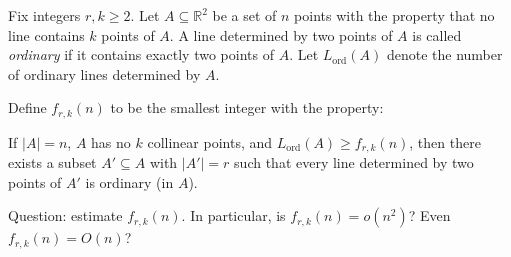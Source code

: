 Fix integers $r,k\ge 2$.
Let $A\subseteq\mathbb{R}^2$ be a set of $n$ points with the property that no line contains $k$ points of $A$.
A line determined by two points of $A$ is called \emph{ordinary} if it contains exactly two points of $A$.
Let $L_\mathrm{ord}(A)$ denote the number of ordinary lines determined by $A$.

Define $f_{r,k}(n)$ to be the smallest integer with the property:

If $|A|=n$, $A$ has no $k$ collinear points, and $L_\mathrm{ord}(A)\ge f_{r,k}(n)$, then there exists a subset $A'\subseteq A$ with $|A'|=r$ such that every line determined by two points of $A'$ is ordinary (in $A$).

Question: estimate $f_{r,k}(n)$. In particular, is $f_{r,k}(n)=o(n^2)$? Even $f_{r,k}(n)=O(n)$?
